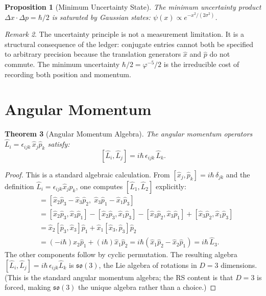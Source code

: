 \documentclass[12pt,a4paper]{article}
\newtheorem{theorem}{Theorem}[section]
\newtheorem{proposition}[theorem]{Proposition}
\theoremstyle{definition}
\theoremstyle{remark}
\newtheorem{remark}[theorem]{Remark}
\begin{document}
\begin{proposition}[Minimum Uncertainty State]
\label{prop:minunc}
The minimum uncertainty product $\Delta x \cdot \Delta p =
\hbar/2$ is saturated by Gaussian states:
$\psi(x) \propto e^{-x^2/(2\sigma^2)}$.
\end{proposition}

\begin{remark}
The uncertainty principle is not a measurement limitation.
It is a structural consequence of the ledger: conjugate entries
cannot both be specified to arbitrary precision because the
translation generators $\hat{x}$ and $\hat{p}$ do not commute.
The minimum uncertainty $\hbar/2 = \varphi^{-5}/2$ is the
irreducible cost of recording both position and momentum.
\end{remark}

\section{Angular Momentum}
\label{sec:angular}

\begin{theorem}[Angular Momentum Algebra]
\label{thm:angular}
The angular momentum operators
$\hat{L}_i = \epsilon_{ijk}\,\hat{x}_j\hat{p}_k$ satisfy:
\begin{equation}
  \boxed{[\hat{L}_i, \hat{L}_j] = i\hbar\,\epsilon_{ijk}\,
  \hat{L}_k.}
\end{equation}
\end{theorem}

\begin{proof}
This is a standard algebraic calculation. From $[\hat{x}_j, \hat{p}_k] = i\hbar\,\delta_{jk}$
and the definition $\hat{L}_i = \epsilon_{ijk}\hat{x}_j\hat{p}_k$,
one computes $[\hat{L}_1, \hat{L}_2]$ explicitly:
\begin{align*}
  [\hat{L}_1, \hat{L}_2]
  &= [\hat{x}_2\hat{p}_3 - \hat{x}_3\hat{p}_2,\;
     \hat{x}_3\hat{p}_1 - \hat{x}_1\hat{p}_3] \\
  &= [\hat{x}_2\hat{p}_3, \hat{x}_3\hat{p}_1]
   - [\hat{x}_2\hat{p}_3, \hat{x}_1\hat{p}_3]
   - [\hat{x}_3\hat{p}_2, \hat{x}_3\hat{p}_1]
   + [\hat{x}_3\hat{p}_2, \hat{x}_1\hat{p}_3] \\
  &= \hat{x}_2[\hat{p}_3, \hat{x}_3]\hat{p}_1
   + \hat{x}_1[\hat{x}_3,\hat{p}_3]\hat{p}_2 \\
  &= (-i\hbar)\hat{x}_2\hat{p}_1 + (i\hbar)\hat{x}_1\hat{p}_2
   = i\hbar(\hat{x}_1\hat{p}_2 - \hat{x}_2\hat{p}_1)
   = i\hbar\,\hat{L}_3.
\end{align*}
The other components follow by cyclic permutation.  The resulting
algebra $[\hat{L}_i, \hat{L}_j] = i\hbar\,\epsilon_{ijk}\hat{L}_k$
is $\mathfrak{so}(3)$, the Lie algebra of rotations in $D = 3$
dimensions.  (This is the standard angular momentum algebra; the
RS content is that $D = 3$ is forced, making
$\mathfrak{so}(3)$ the unique algebra rather than a choice.)
\end{proof}
\end{document}
